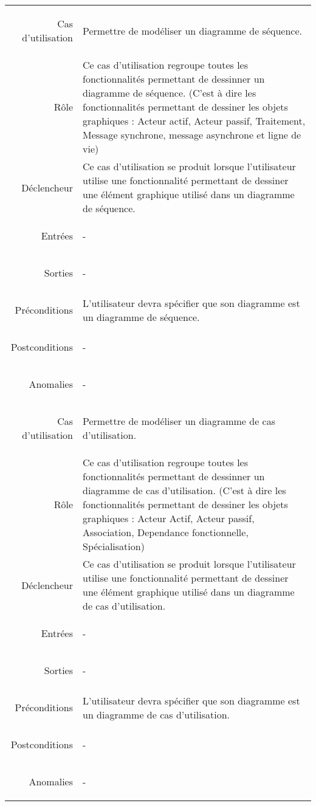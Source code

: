 \documentclass[12pt,a4paper,openany]{report}
\begin{document}
	\begin{longtable}{>{\begin{bf}} r <{\end{bf}}!{:}p{13.5cm}}

	Cas d'utilisation & Permettre de modéliser un diagramme de séquence.\\
	Rôle & Ce cas d'utilisation regroupe toutes les fonctionnalités permettant de dessinner un diagramme de séquence.
	(C'est à dire les fonctionnalités permettant de dessiner les objets graphiques : Acteur actif, Acteur passif, Traitement,
	Message synchrone, message asynchrone et ligne de vie)\\
	Déclencheur & Ce cas d'utilisation se produit lorsque l'utilisateur utilise une fonctionnalité permettant de dessiner une élément
	graphique utilisé dans un diagramme de séquence.\\
	Entrées & -\\
	Sorties & -\\
	Préconditions & L'utilisateur devra spécifier que son diagramme est un diagramme de séquence. \\
	Postconditions & -\\\vspace{10px}
	Anomalies & -\\

	Cas d'utilisation & Permettre de modéliser un diagramme de cas d'utilisation.\\
	Rôle & Ce cas d'utilisation regroupe toutes les fonctionnalités permettant de dessinner un diagramme de cas d'utilisation.
	(C'est à dire les fonctionnalités permettant de dessiner les objets graphiques : Acteur Actif, Acteur passif, Association,
	Dependance fonctionnelle, Spécialisation)\\
	Déclencheur & Ce cas d'utilisation se produit lorsque l'utilisateur utilise une fonctionnalité permettant de dessiner une
	élément graphique utilisé dans un diagramme de cas d'utilisation.\\
	Entrées & -\\
	Sorties & -\\
	Préconditions & L'utilisateur devra spécifier que son diagramme est un diagramme de cas d'utilisation.\\
	Postconditions & -\\\vspace{10px}
	Anomalies & -\\


\end{longtable}
\end{document}
